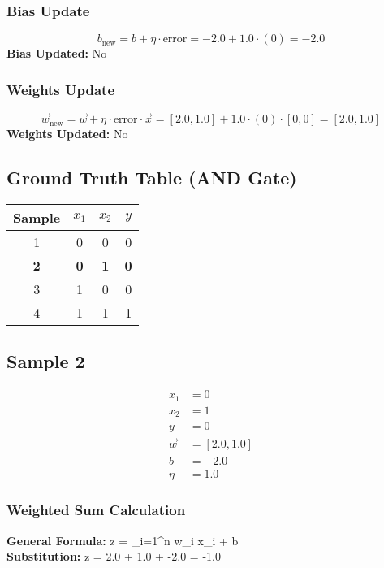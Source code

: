 \documentclass{article}
\begin{document}
\subsubsection*{Bias Update}
\[
b_{\text{new}} = b + \eta \cdot \text{error} = -2.0 + 1.0 \cdot (0) = -2.0
\]
\textbf{Bias Updated:} No

\subsubsection*{Weights Update}
\[
\vec{w}_{\text{new}} = \vec{w} + \eta \cdot \text{error} \cdot \vec{x} = 
[2.0, 1.0] + 1.0 \cdot (0) \cdot [0, 0] = 
[2.0, 1.0]
\]
\textbf{Weights Updated:} No

\subsection*{Ground Truth Table (AND Gate)}
\begin{center}
\begin{tabular}{|c|c|c|c|}
\hline
\textbf{Sample} & $x_1$ & $x_2$ & $y$ \\
\hline
1 & 0 & 0 & 0 \\
\hline
\rowcolor{yellow} \textbf{2} & \textbf{0} & \textbf{1} & \textbf{0} \\
\hline
3 & 1 & 0 & 0 \\
\hline
4 & 1 & 1 & 1 \\
\hline
\end{tabular}
\end{center}

\subsection*{Sample 2}
\begin{align*}
x_1 &= 0 \\
x_2 &= 1 \\
y &= 0 \\
\vec{w} &= [2.0, 1.0] \\
b &= -2.0 \\
\eta &= 1.0
\end{align*}

\subsubsection*{Weighted Sum Calculation}
\textbf{General Formula:} \quad
z = \sum_{i=1}^{n} w_i x_i + b
\\
\textbf{Substitution:} \quad
z = 2.0  + 1.0  + -2.0 = -1.0
\end{document}
